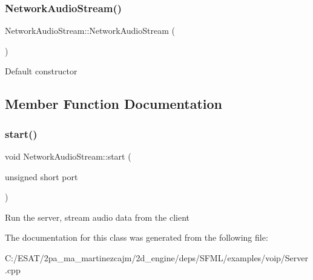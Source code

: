 \subsubsection{\texorpdfstring{Network\+Audio\+Stream()}{NetworkAudioStream()}}
{\footnotesize\ttfamily Network\+Audio\+Stream\+::\+Network\+Audio\+Stream (\begin{DoxyParamCaption}{ }\end{DoxyParamCaption})\hspace{0.3cm}{\ttfamily [inline]}}

Default constructor 

\subsection{Member Function Documentation}
\mbox{\label{class_network_audio_stream_a5c698fc66d35fe30ae5e0148c03766e3}} 
\subsubsection{\texorpdfstring{start()}{start()}}
{\footnotesize\ttfamily void Network\+Audio\+Stream\+::start (\begin{DoxyParamCaption}\item[{unsigned short}]{port }\end{DoxyParamCaption})\hspace{0.3cm}{\ttfamily [inline]}}

Run the server, stream audio data from the client 

The documentation for this class was generated from the following file\+:\begin{DoxyCompactItemize}
\item 
C\+:/\+E\+S\+A\+T/2pa\+\_\+ma\+\_\+martinezcajm/2d\+\_\+engine/deps/\+S\+F\+M\+L/examples/voip/Server.\+cpp\end{DoxyCompactItemize}
